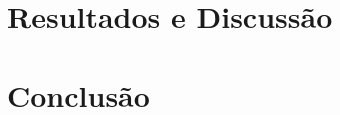 \documentclass{abntex2-ufv}
\begin{document}

\chapter{Resultados e Discussão}\label{sec:resultados}


\chapter{Conclusão}\label{sec:conclusao}



\postextual

\printbibliography



\end{document}
